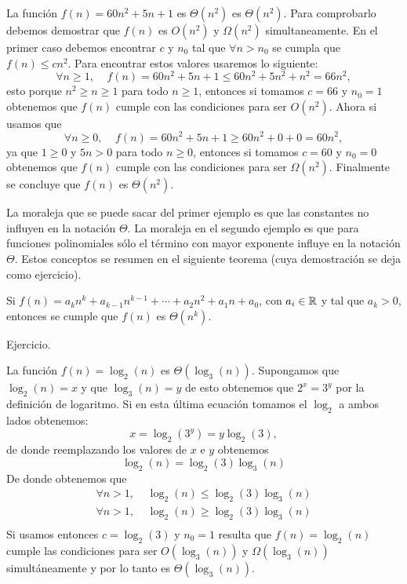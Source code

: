 \begin{ejemplo}
La función $f(n)=60n^2+5n+1$ es $\Theta(n^2)$ es $\Theta(n^2)$.
Para comprobarlo debemos demostrar que $f(n)$ es $O(n^2)$ y $\Omega(n^2)$ simultaneamente.
En el primer caso debemos encontrar $c$ y $n_0$ tal que $\forall n>n_0$ se cumpla que $f(n)\leq cn^2$.
Para encontrar estos valores usaremos lo siguiente:
\[
\forall n\geq 1,\;\;\;\;f(n)=60n^2+5n+1\leq 60n^2+5n^2+n^2=66n^2,
\]
esto porque $n^2\geq n\geq 1$ para todo $n\geq 1$, entonces si tomamos $c=66$ y $n_0=1$ obtenemos que $f(n)$ cumple con las condiciones para ser $O(n^2)$.
Ahora si usamos que
\[
\forall n\geq 0,\;\;\;\;f(n)=60n^2+5n+1\geq 60n^2+0+0=60n^2,
\]
ya que $1\geq 0$ y $5n>0$ para todo $n\geq 0$, entonces si tomamos $c=60$ y $n_0=0$ obtenemos que $f(n)$ cumple con las condiciones para ser $\Omega(n^2)$.
Finalmente se concluye que $f(n)$ es $\Theta(n^2)$.
\end{ejemplo}

La moraleja que se puede sacar del primer ejemplo es que las constantes no influyen en la notación $\Theta$.
La moraleja en el segundo ejemplo es que para funciones polinomiales sólo el término con mayor exponente influye en la notación $\Theta$.
Estos conceptos se resumen en el siguiente teorema (cuya demostración se deja como ejercicio).

\begin{teorema}
Si $f(n)=a_kn^k+a_{k-1}n^{k-1}+\cdots+a_2n^2+a_1n+a_0$, con $a_i\in\mathbb{R}$ y tal que $a_k>0$, entonces se cumple que $f(n)$ es $\Theta(n^k)$.

\begin{demostracion}
Ejercicio.
\end{demostracion}
\end{teorema}

\begin{ejemplo}
La función $f(n)=\log_2(n)$ es $\Theta(\log_3(n))$.
Supongamos que $\log_2(n)=x$ y que $\log_3(n)=y$ de esto obtenemos que $2^x=3^y$ por la definición de logaritmo.
Si en esta última ecuación tomamos el $\log_2$ a ambos lados obtenemos:
\[
x=\log_2(3^y)=y\log_2(3),
\]
de donde reemplazando los valores de $x$ e $y$ obtenemos
\[
\log_2(n)=\log_2(3)\log_3(n)
\]
De donde obtenemos que
\[
\begin{array}{l}
\forall n>1,\;\;\;\; \log_2(n)\leq \log_2(3)\log_3(n) \\
\forall n>1,\;\;\;\; \log_2(n)\geq \log_2(3)\log_3(n) \\
\end{array}
\]
Si usamos entonces $c=\log_2(3)$ y $n_0=1$ resulta que $f(n)=\log_2(n)$ cumple las condiciones para ser $O(\log_3(n))$ y $\Omega(\log_3(n))$ simultáneamente y por lo tanto es $\Theta(\log_3(n))$.
\end{ejemplo}

